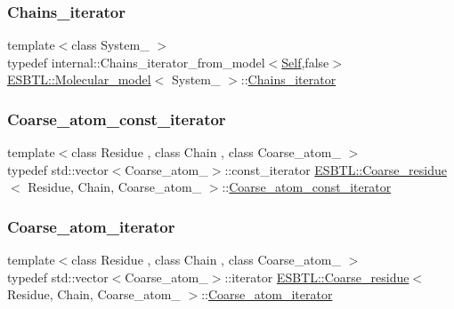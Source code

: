 \mbox{\label{group__grp__iters_ga763cc293a5df9ae7dd6e31c198dce24b}} 
\subsubsection{\texorpdfstring{Chains\+\_\+iterator}{Chains\_iterator}}
{\footnotesize\ttfamily template$<$class System\+\_\+ $>$ \\
typedef internal\+::\+Chains\+\_\+iterator\+\_\+from\+\_\+model$<$\hyperlink{classESBTL_1_1Molecular__model}{Self},false$>$ \hyperlink{classESBTL_1_1Molecular__model}{E\+S\+B\+T\+L\+::\+Molecular\+\_\+model}$<$ System\+\_\+ $>$\+::\hyperlink{group__grp__iters_ga763cc293a5df9ae7dd6e31c198dce24b}{Chains\+\_\+iterator}}

\mbox{\label{group__grp__iters_ga5a4a865846cdde342538df7fc03c80ce}} 
\subsubsection{\texorpdfstring{Coarse\+\_\+atom\+\_\+const\+\_\+iterator}{Coarse\_atom\_const\_iterator}}
{\footnotesize\ttfamily template$<$class Residue , class Chain , class Coarse\+\_\+atom\+\_\+ $>$ \\
typedef std\+::vector$<$Coarse\+\_\+atom\+\_\+$>$\+::const\+\_\+iterator \hyperlink{classESBTL_1_1Coarse__residue}{E\+S\+B\+T\+L\+::\+Coarse\+\_\+residue}$<$ Residue, Chain, Coarse\+\_\+atom\+\_\+ $>$\+::\hyperlink{group__grp__iters_ga5a4a865846cdde342538df7fc03c80ce}{Coarse\+\_\+atom\+\_\+const\+\_\+iterator}}

\mbox{\label{group__grp__iters_ga09a38741d50d3b7296dae83eb0911e49}} 
\subsubsection{\texorpdfstring{Coarse\+\_\+atom\+\_\+iterator}{Coarse\_atom\_iterator}}
{\footnotesize\ttfamily template$<$class Residue , class Chain , class Coarse\+\_\+atom\+\_\+ $>$ \\
typedef std\+::vector$<$Coarse\+\_\+atom\+\_\+$>$\+::iterator \hyperlink{classESBTL_1_1Coarse__residue}{E\+S\+B\+T\+L\+::\+Coarse\+\_\+residue}$<$ Residue, Chain, Coarse\+\_\+atom\+\_\+ $>$\+::\hyperlink{group__grp__iters_ga09a38741d50d3b7296dae83eb0911e49}{Coarse\+\_\+atom\+\_\+iterator}}

